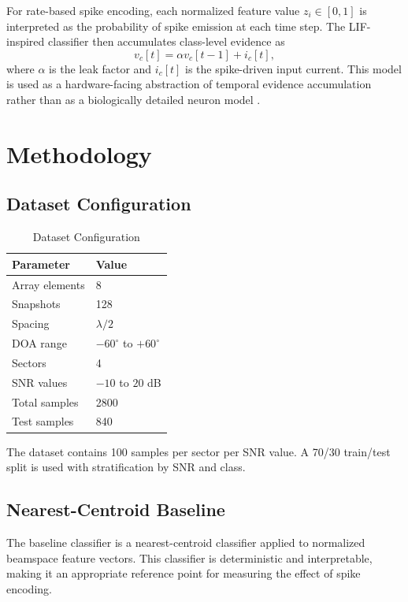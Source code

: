 \documentclass[conference]{IEEEtran}
\begin{document}
For rate-based spike encoding, each normalized feature value $z_i\in[0,1]$ is interpreted as the probability of spike emission at each time step. The LIF-inspired classifier then accumulates class-level evidence as
\begin{equation}
    v_c[t]=\alpha v_c[t-1]+i_c[t],
\end{equation}
where $\alpha$ is the leak factor and $i_c[t]$ is the spike-driven input current. This model is used as a hardware-facing abstraction of temporal evidence accumulation rather than as a biologically detailed neuron model \cite{gerstner,roy}.

\section{Methodology}

\subsection{Dataset Configuration}

\begin{table}[t]
\centering
\caption{Dataset Configuration}
\begin{tabular}{ll}
\toprule
Parameter & Value \\
\midrule
Array elements & 8 \\
Snapshots & 128 \\
Spacing & $\lambda/2$ \\
DOA range & $-60^{\circ}$ to $+60^{\circ}$ \\
Sectors & 4 \\
SNR values & $-10$ to $20$ dB \\
Total samples & 2800 \\
Test samples & 840 \\
\bottomrule
\end{tabular}
\end{table}

The dataset contains 100 samples per sector per SNR value. A 70/30 train/test split is used with stratification by SNR and class.

\subsection{Nearest-Centroid Baseline}

The baseline classifier is a nearest-centroid classifier applied to normalized beamspace feature vectors. This classifier is deterministic and interpretable, making it an appropriate reference point for measuring the effect of spike encoding.
\end{document}
